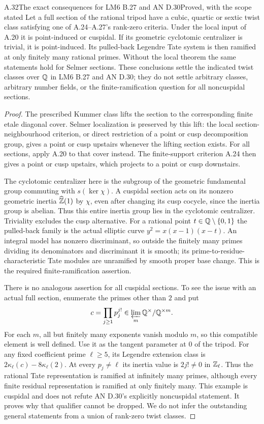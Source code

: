 \begin{statement}{A.32}{The exact consequences for LM6 B.27 and AN D.30}{Proved, with the scope stated}
Let a full section of the rational tripod have a cubic, quartic or sextic twist class satisfying one of A.24--A.27's rank-zero criteria. Under the local input of A.20 it is point-induced or cuspidal. If its geometric cyclotomic centralizer is trivial, it is point-induced. Its pulled-back Legendre Tate system is then ramified at only finitely many rational primes. Without the local theorem the same statements hold for Selmer sections. These conclusions settle the indicated twist classes over $\mathbb Q$ in LM6 B.27 and AN D.30; they do not settle arbitrary classes, arbitrary number fields, or the finite-ramification question for all noncuspidal sections.
\end{statement}
\begin{proof}
The prescribed Kummer class lifts the section to the corresponding finite etale diagonal cover. Selmer localization is preserved by this lift: the local section-neighbourhood criterion, or direct restriction of a point or cusp decomposition group, gives a point or cusp upstairs whenever the lifting section exists. For all sections, apply A.20 to that cover instead. The finite-support criterion A.24 then gives a point or cusp upstairs, which projects to a point or cusp downstairs.

The cyclotomic centralizer here is the subgroup of the geometric fundamental group commuting with $s(\ker\chi)$. A cuspidal section acts on its nonzero geometric inertia $\widehat{\mathbb Z}(1)$ by $\chi$, even after changing its cusp cocycle, since the inertia group is abelian. Thus this entire inertia group lies in the cyclotomic centralizer. Triviality excludes the cusp alternative. For a rational point $t\in\mathbb Q\setminus\{0,1\}$ the pulled-back family is the actual elliptic curve $y^2=x(x-1)(x-t)$. An integral model has nonzero discriminant, so outside the finitely many primes dividing its denominators and discriminant it is smooth; its prime-to-residue-characteristic Tate modules are unramified by smooth proper base change. This is the required finite-ramification assertion.

There is no analogous assertion for all cuspidal sections. To see the issue with an actual full section, enumerate the primes other than $2$ and put
\[
c=\prod_{j\ge1}p_j^{j!}\in\varprojlim_m\mathbb Q^\times/\mathbb Q^{\times m}.
\]
For each $m$, all but finitely many exponents vanish modulo $m$, so this compatible element is well defined. Use it as the tangent parameter at $0$ of the tripod. For any fixed coefficient prime $\ell\ge5$, its Legendre extension class is $2\kappa_\ell(c)-8\kappa_\ell(2)$. At every $p_j\ne\ell$ its inertia value is $2j!\ne0$ in $\mathbb Z_\ell$. Thus the rational Tate representation is ramified at infinitely many primes, although every finite residual representation is ramified at only finitely many. This example is cuspidal and does not refute AN D.30's explicitly noncuspidal statement. It proves why that qualifier cannot be dropped. We do not infer the outstanding general statements from a union of rank-zero twist classes.
\end{proof}
